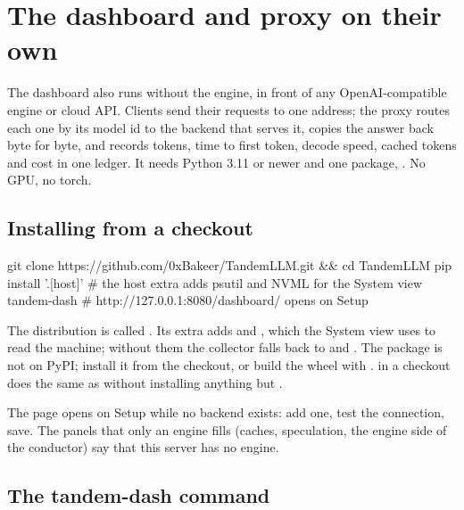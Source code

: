\chapter{The dashboard and proxy on their own}\label{ch:install-dash}

The dashboard also runs without the engine, in front of any OpenAI-compatible engine or cloud API. Clients send their requests to one address; the proxy routes each one by its model id to the backend that serves it, copies the answer back byte for byte, and records tokens, time to first token, decode speed, cached tokens and cost in one ledger. It needs Python 3.11 or newer and one package, . No GPU, no torch.

\section{Installing from a checkout}

\begin{shell}
git clone https://github.com/0xBakeer/TandemLLM.git && cd TandemLLM
pip install '.[host]'      # the host extra adds psutil and NVML for the System view
tandem-dash                # http://127.0.0.1:8080/dashboard/ opens on Setup
\end{shell}

The distribution is called . Its  extra adds  and , which the System view uses to read the machine; without them the collector falls back to  and . The package is not on PyPI; install it from the checkout, or build the wheel with .  in a checkout does the same as  without installing anything but .

The page opens on Setup while no backend exists: add one, test the connection, save. The panels that only an engine fills (caches, speculation, the engine side of the conductor) say that this server has no engine.

\section{The tandem-dash command}

